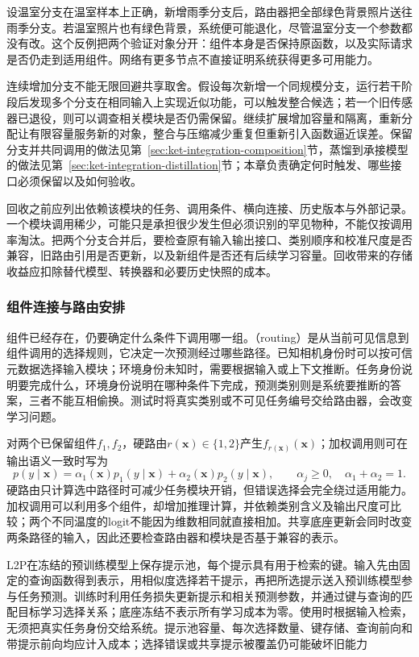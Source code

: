 设温室分支在温室样本上正确，新增雨季分支后，路由器把全部绿色背景照片送往雨季分支。若温室照片也有绿色背景，系统便可能退化，尽管温室分支一个参数都没有改。这个反例把两个验证对象分开：组件本身是否保持原函数，以及实际请求是否仍走到适用组件。网络有更多节点不直接证明系统获得更多可用能力。

连续增加分支不能无限回避共享取舍。假设每次新增一个同规模分支，运行若干阶段后发现多个分支在相同输入上实现近似功能，可以触发整合候选；若一个旧传感器已退役，则可以调查相关模块是否仍需保留。继续扩展增加容量和隔离，重新分配让有限容量服务新的对象，整合与压缩减少重复但重新引入函数逼近误差。保留分支并共同调用的做法见第~\ref{sec:ket-integration-composition}节，蒸馏到承接模型的做法见第~\ref{sec:ket-integration-distillation}节；本章负责确定何时触发、哪些接口必须保留以及如何验收。

回收之前应列出依赖该模块的任务、调用条件、横向连接、历史版本与外部记录。一个模块调用稀少，可能只是承担很少发生但必须识别的罕见物种，不能仅按调用率淘汰。把两个分支合并后，要检查原有输入输出接口、类别顺序和校准尺度是否兼容，旧路由引用是否更新，以及新组件是否还有后续学习容量。回收带来的存储收益应扣除替代模型、转换器和必要历史快照的成本。

\subsubsection{组件连接与路由安排}
\label{sec:ket-update-routing}

组件已经存在，仍要确定什么条件下调用哪一组。（routing）是从当前可见信息到组件调用的选择规则，它决定一次预测经过哪些路径。已知相机身份时可以按可信元数据选择输入模块；环境身份未知时，需要根据输入或上下文推断。任务身份说明要完成什么，环境身份说明在哪种条件下完成，预测类别则是系统要推断的答案，三者不能互相偷换。测试时将真实类别或不可见任务编号交给路由器，会改变学习问题。

对两个已保留组件$f_1,f_2$，硬路由$r(\bm x)\in\{1,2\}$产生$f_{r(\bm x)}(\bm x)$；加权调用则可在输出语义一致时写为
\[
p(y\mid\bm x)=
\alpha_1(\bm x)p_1(y\mid\bm x)
+\alpha_2(\bm x)p_2(y\mid\bm x),\qquad
\alpha_j\ge0,\quad\alpha_1+\alpha_2=1.
\]
硬路由只计算选中路径时可减少任务模块开销，但错误选择会完全绕过适用能力。加权调用可以利用多个组件，却增加推理计算，并依赖类别含义及输出尺度可比较；两个不同温度的logit不能因为维数相同就直接相加。共享底座更新会同时改变两条路径的输入，因此还要检查路由器和模块是否基于兼容的表示。

L2P在冻结的预训练模型上保存提示池，每个提示具有用于检索的键。输入先由固定的查询函数得到表示，用相似度选择若干提示，再把所选提示送入预训练模型参与任务预测。训练时利用任务损失更新提示和相关预测参数，并通过键与查询的匹配目标学习选择关系；底座冻结不表示所有学习成本为零。使用时根据输入检索，无须把真实任务身份交给系统。提示池容量、每次选择数量、键存储、查询前向和带提示前向均应计入成本；选择错误或共享提示被覆盖仍可能破坏旧能力

